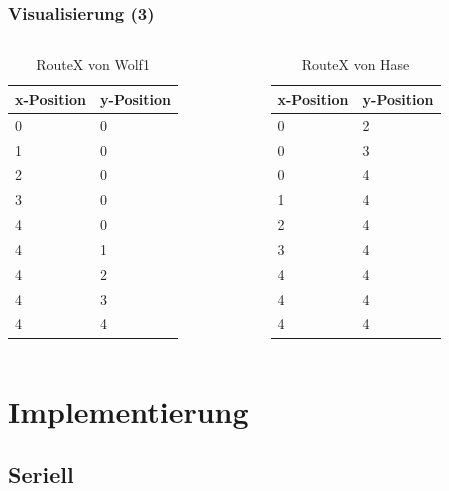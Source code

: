 \documentclass{beamer}
\begin{document}
\begin{frame}

\frametitle{Visualisierung (3)}
\begin{columns}[c] %

\begin{table}
\begin{tabular}{l l}
\toprule
\textbf{x-Position} & \textbf{y-Position}\\
\midrule
 0 & 0 \\
1 & 0 \\
2 & 0 \\
3 & 0 \\
4 & 0 \\
4 & 1 \\
4 & 2 \\
4 & 3 \\
4 & 4 \\
\bottomrule
\end{tabular}
\caption{RouteX von Wolf1}
\end{table}

\begin{table}
\begin{tabular}{l l}
\toprule
\textbf{x-Position} & \textbf{y-Position}\\
\midrule
 0 & 2 \\
0 & 3 \\
0 & 4 \\
1 & 4 \\
2 & 4 \\
3 & 4 \\
4 & 4 \\
4 & 4 \\
4 & 4 \\
\bottomrule
\end{tabular}
\caption{RouteX von Hase}
\end{table}
\end{columns}

\end{frame}

\section{Implementierung}
\subsection{Seriell}
\end{document}
